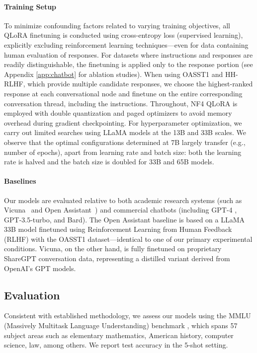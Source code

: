 \paragraph{Training Setup} To minimize confounding factors related to varying training objectives, all QLoRA finetuning is conducted using cross-entropy loss (supervised learning), explicitly excluding reinforcement learning techniques—even for data containing human evaluation of responses. For datasets where instructions and responses are readily distinguishable, the finetuning is applied only to the response portion (see Appendix \ref{app:chatbot} for ablation studies). When using OASST1 and HH-RLHF, which provide multiple candidate responses, we choose the highest-ranked response at each conversational node and finetune on the entire corresponding conversation thread, including the instructions. Throughout, NF4 \textsc{QLoRA} is employed with double quantization and paged optimizers to avoid memory overhead during gradient checkpointing. For hyperparameter optimization, we carry out limited searches using LLaMA models at the 13B and 33B scales. We observe that the optimal configurations determined at 7B largely transfer (e.g., number of epochs), apart from learning rate and batch size: both the learning rate is halved and the batch size is doubled for 33B and 65B models.

\paragraph{Baselines} Our models are evaluated relative to both academic research systems (such as Vicuna~\citep{vicuna2023} and Open Assistant~\citep{kopf2023openassistant}) and commercial chatbots (including GPT-4 \citep{openai2023gpt}, GPT-3.5-turbo, and Bard). The Open Assistant baseline is based on a LLaMA 33B model finetuned using Reinforcement Learning from Human Feedback (RLHF) with the OASST1 dataset—identical to one of our primary experimental conditions. Vicuna, on the other hand, is fully finetuned on proprietary ShareGPT conversation data, representing a distilled variant derived from OpenAI's GPT models.

\subsection{Evaluation}

Consistent with established methodology, we assess our models using the MMLU (Massively Multitask Language Understanding) benchmark \citep{hendrycksmeasuring}, which spans 57 subject areas such as elementary mathematics, American history, computer science, law, among others. We report test accuracy in the 5-shot setting.

